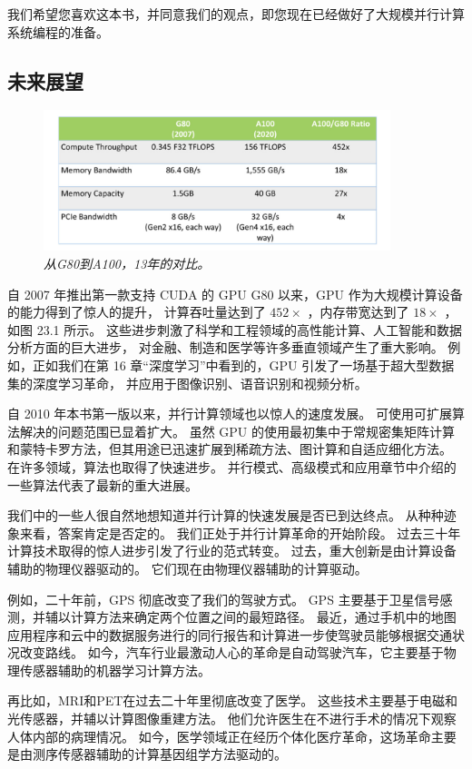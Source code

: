 我们希望您喜欢这本书，并同意我们的观点，即您现在已经做好了大规模并行计算系统编程的准备。

\subsection{未来展望}
\begin{figure}[H]
	\centering
	\includegraphics[width=0.9\textwidth]{figs/F23.1.png}
	\caption{\textit{从G80到A100，13年的对比。}}
\end{figure}

自 2007 年推出第一款支持 CUDA 的 GPU G80 以来，GPU 作为大规模计算设备的能力得到了惊人的提升，
计算吞吐量达到了 $452\times$ ，内存带宽达到了 $18\times$ ，如图 23.1 所示。 
这些进步刺激了科学和工程领域的高性能计算、人工智能和数据分析方面的巨大进步，
对金融、制造和医学等许多垂直领域产生了重大影响。 
例如，正如我们在第 16 章“深度学习”中看到的，GPU 引发了一场基于超大型数据集的深度学习革命，
并应用于图像识别、语音识别和视频分析。

自 2010 年本书第一版以来，并行计算领域也以惊人的速度发展。 可使用可扩展算法解决的问题范围已显着扩大。 
虽然 GPU 的使用最初集中于常规密集矩阵计算和蒙特卡罗方法，但其用途已迅速扩展到稀疏方法、图计算和自适应细化方法。 
在许多领域，算法也取得了快速进步。 并行模式、高级模式和应用章节中介绍的一些算法代表了最新的重大进展。

我们中的一些人很自然地想知道并行计算的快速发展是否已到达终点。 从种种迹象来看，答案肯定是否定的。 
我们正处于并行计算革命的开始阶段。 过去三十年计算技术取得的惊人进步引发了行业的范式转变。 
过去，重大创新是由计算设备辅助的物理仪器驱动的。 它们现在由物理仪器辅助的计算驱动。

例如，二十年前，GPS 彻底改变了我们的驾驶方式。 GPS 主要基于卫星信号感测，并辅以计算方法来确定两个位置之间的最短路径。 
最近，通过手机中的地图应用程序和云中的数据服务进行的同行报告和计算进一步使驾驶员能够根据交通状况改变路线。 
如今，汽车行业最激动人心的革命是自动驾驶汽车，它主要基于物理传感器辅助的机器学习计算方法。

再比如，MRI和PET在过去二十年里彻底改变了医学。 这些技术主要基于电磁和光传感器，并辅以计算图像重建方法。 
他们允许医生在不进行手术的情况下观察人体内部的病理情况。 
如今，医学领域正在经历个体化医疗革命，这场革命主要是由测序传感器辅助的计算基因组学方法驱动的。

